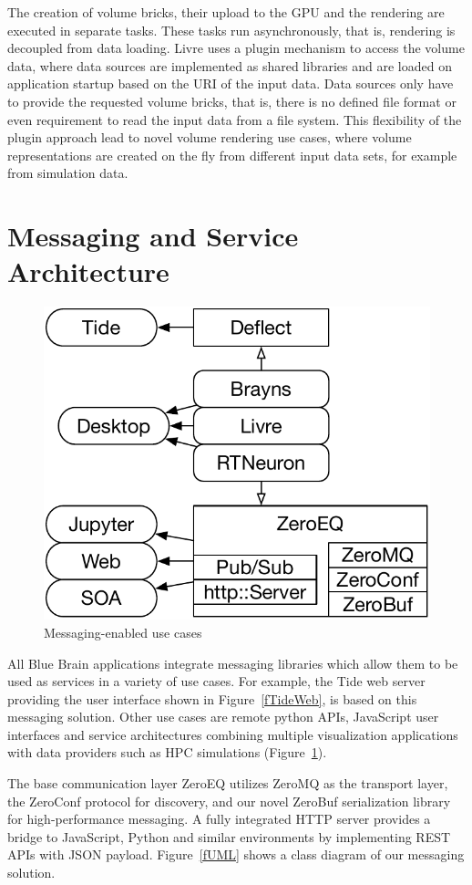 \documentclass[10pt]{llncs}
\newcommand{\fig}[1]{Figure~\ref{#1}}
\begin{document}
The creation of volume bricks, their upload to the GPU and the rendering are
executed in separate tasks. These tasks run asynchronously, that is, rendering
is decoupled from data loading. Livre uses a plugin mechanism to access the
volume data, where data sources are implemented as shared libraries and are
loaded on application startup based on the URI of the input data. Data sources
only have to provide the requested volume bricks, that is, there is no defined
file format or even requirement to read the input data from a file system. This
flexibility of the plugin approach lead to novel volume rendering use cases,
where volume representations are created on the fly from different input data
sets, for example from simulation data.

\clearpage
\section{Messaging and Service Architecture}

\begin{figure}\center\vspace{-6ex}
  \includegraphics[width=.382\textwidth]{images/ZeroMS}
  {\caption{\label{fZero}Messaging-enabled use cases}}\vspace{-1em}
\end{figure}

All Blue Brain applications integrate messaging libraries which allow them to be
used as services in a variety of use cases. For example, the Tide web server
providing the user interface shown in \fig{fTideWeb}, is based on this messaging
solution. Other use cases are remote python APIs, JavaScript user interfaces and
service architectures combining multiple visualization applications with data
providers such as HPC simulations (\fig{fZero}).

The base communication layer ZeroEQ utilizes ZeroMQ as the transport layer, the
ZeroConf protocol for discovery, and our novel ZeroBuf serialization library for
high-performance messaging. A fully integrated HTTP server provides a bridge to
JavaScript, Python and similar environments by implementing REST APIs with JSON
payload. \fig{fUML} shows a class diagram of our messaging solution.
\end{document}
